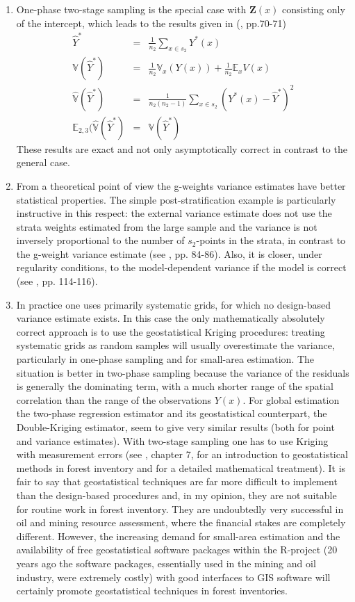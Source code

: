 \documentclass[a4paper,12pt,leqno, titlepage]{article}
\newcommand{\EX}{\mathbb{E}}
\newcommand{\VAR}{\mathbb{V}}
\begin{document}
 \begin{enumerate}
 \item
 One-phase two-stage sampling is the special case with $\pmb{Z}(x)$ consisting only of the intercept, which leads to the results given in (\cite{mandallaz}, pp.70-71)
 \begin{eqnarray*}
 \hat{Y}^*&=&\frac{1}{n_2}\sum_{x\in{s_2}}Y^*(x) \\
 \VAR(\hat{Y}^*)&=&\frac{1}{n_2}\VAR_x(Y(x))+\frac{1}{n_2}\EX_x V(x) \\
 \hat{\VAR}(\hat{Y}^*)&=&\frac{1}{n_2(n_2-1)}\sum_{x\in{s_2}}(Y^*(x)-\hat{Y}^*)^2 \\
 \EX_{2,3}(\hat{\VAR}(\hat{Y}^*)&=& \VAR(\hat{Y}^*)
 \end{eqnarray*}
 These results are exact and not only asymptotically correct in contrast to the general case.
 \item
 From a theoretical point of view the g-weights variance estimates have better statistical properties. The simple post-stratification example is particularly instructive in this respect: the external variance estimate does not use the strata weights estimated from the large sample and the variance is not inversely proportional to the number of $s_2$-points in the strata, in contrast to the g-weight variance estimate (see \cite{mandallaz}, pp. 84-86). Also, it is closer, under regularity conditions, to the model-dependent variance if the model is correct (see \cite{mandallaz}, pp. 114-116).
 \item
 In practice one uses primarily systematic grids, for which no design-based variance estimate exists. In this case the only mathematically absolutely correct approach is to use the geostatistical Kriging procedures: treating systematic grids as random samples will usually overestimate the variance, particularly in one-phase sampling and for small-area estimation. The situation is better in two-phase sampling because the variance of the residuals is generally the dominating term,  with a much shorter range of the spatial correlation than the range of the observations $Y(x)$. For global estimation the two-phase regression estimator and its geostatistical counterpart, the Double-Kriging estimator, seem to give very similar results (both for point and variance estimates). With two-stage sampling one has to use Kriging with measurement errors (see \cite{mandallaz}, chapter 7, for an introduction to geostatistical methods in forest inventory and \cite{dmhabil} for a detailed mathematical treatment). It is fair to say that geostatistical techniques are far more difficult to implement than the design-based procedures and, in my opinion, they are not suitable for routine work in forest inventory. They are undoubtedly very successful in oil and mining resource assessment, where the financial stakes are completely different. However, the increasing demand for small-area estimation and the availability of free geostatistical software packages within the R-project (20 years ago the software packages, essentially used in the mining and oil industry, were extremely costly) with good interfaces to GIS software will certainly promote geostatistical techniques in forest inventories.
 \end{enumerate}
\end{document}
